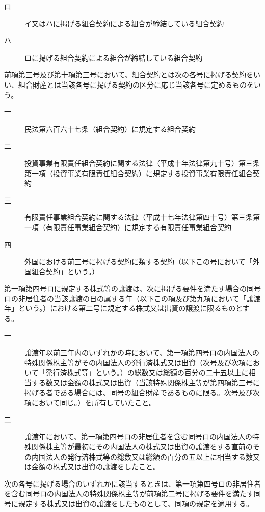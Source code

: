 \documentclass[twocolumn,a4j,10pt]{ltjtarticle}
\begin{document}
\begin{description}
\begin{description}
\begin{description}
\item[ロ]イ又はハに掲げる組合契約による組合が締結している組合契約
\item[ハ]ロに掲げる組合契約による組合が締結している組合契約
\end{description}
\end{description}
\item[\rensuji{5}]前項第三号及び第十項第三号において、組合契約とは次の各号に掲げる契約をいい、組合財産とは当該各号に掲げる契約の区分に応じ当該各号に定めるものをいう。
\begin{description}
\item[一]民法第六百六十七条（組合契約）に規定する組合契約
\item[二]投資事業有限責任組合契約に関する法律（平成十年法律第九十号）第三条第一項（投資事業有限責任組合契約）に規定する投資事業有限責任組合契約
\item[三]有限責任事業組合契約に関する法律（平成十七年法律第四十号）第三条第一項（有限責任事業組合契約）に規定する有限責任事業組合契約
\item[四]外国における前三号に掲げる契約に類する契約（以下この号において「外国組合契約」という。）
\end{description}
\item[\rensuji{6}]第一項第四号ロに規定する株式等の譲渡は、次に掲げる要件を満たす場合の同号ロの非居住者の当該譲渡の日の属する年（以下この項及び第九項において「譲渡年」という。）における第二号に規定する株式又は出資の譲渡に限るものとする。
\begin{description}
\item[一]譲渡年以前三年内のいずれかの時において、第一項第四号ロの内国法人の特殊関係株主等がその内国法人の発行済株式又は出資（次号及び次項において「発行済株式等」という。）の総数又は総額の百分の二十五以上に相当する数又は金額の株式又は出資（当該特殊関係株主等が第四項第三号に掲げる者である場合には、同号の組合財産であるものに限る。次号及び次項において同じ。）を所有していたこと。
\item[二]譲渡年において、第一項第四号ロの非居住者を含む同号ロの内国法人の特殊関係株主等が最初にその内国法人の株式又は出資の譲渡をする直前のその内国法人の発行済株式等の総数又は総額の百分の五以上に相当する数又は金額の株式又は出資の譲渡をしたこと。
\end{description}
\item[\rensuji{7}]次の各号に掲げる場合のいずれかに該当するときは、第一項第四号ロの非居住者を含む同号ロの内国法人の特殊関係株主等が前項第二号に掲げる要件を満たす同号に規定する株式又は出資の譲渡をしたものとして、同項の規定を適用する。

\end{description}
\end{document}
